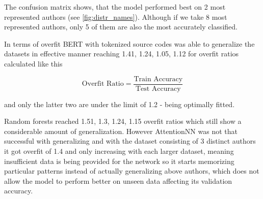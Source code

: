 \documentclass{article}
\begin{document}
The confusion matrix shows, that the model performed best on 2 most represented authors
(see \ref{fig:distr_names}). Although if we take 8 most represented authors, only 5 of them are also 
the most accurately classified.


In terms of overfit BERT with tokenized source codes was able to generalize the datasets in effective manner reaching 1.41, 1.24, 1.05, 1.12 for overfit ratios 
calculated like this

\begin{equation}
    \text{Overfit Ratio} = \frac{\text{Train Accuracy}}{\text{Test Accuracy}}
\end{equation}

and only the latter two are under the limit of 1.2 - being optimally fitted. 

Random forests reached 1.51, 1.3, 1.24, 1.15 overfit ratios which still show a considerable amount of generalization. However AttentionNN was not that successful with generalizing 
and with the dataset consisting of 3 distinct authors it got overfit of 1.4 and only increasing with each larger dataset, meaning insufficient data is being provided for the network so it starts memorizing particular 
patterns instead of actually generalizing above authors, which does not allow the model to perform better on unseen data affecting its validation accuracy.
\end{document}
